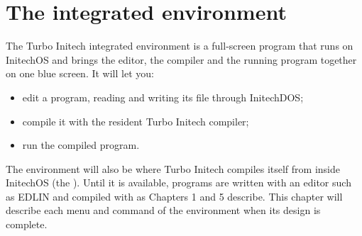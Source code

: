 \chapter{The integrated environment}

The Turbo Initech integrated environment is a full-screen program that
runs on InitechOS and brings the editor, the compiler and the running
program together on one blue screen.  It will let you:

\begin{itemize}
\item edit a program, reading and writing its file through InitechDOS;
\item compile it with the resident Turbo Initech compiler;
\item run the compiled program.
\end{itemize}

The environment will also be where Turbo Initech compiles itself from
inside InitechOS (the ).  Until it is
available, programs are written with an editor such as EDLIN and compiled
with  as Chapters 1 and 5 describe.  This chapter will
describe each menu and command of the environment when its design is
complete.
